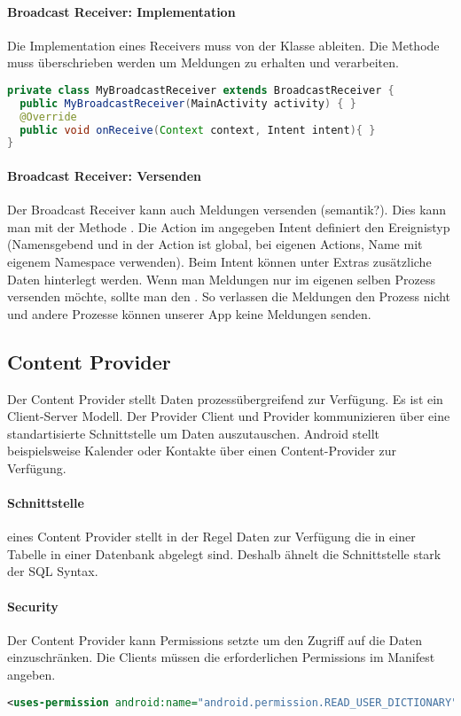 \paragraph{Broadcast Receiver: Implementation} Die Implementation eines Receivers muss von der Klasse  ableiten. Die Methode  muss überschrieben werden um Meldungen zu erhalten und verarbeiten.
\begin{lstlisting}[language=java]
private class MyBroadcastReceiver extends BroadcastReceiver {
  public MyBroadcastReceiver(MainActivity activity) { }
  @Override
  public void onReceive(Context context, Intent intent){ }
}
\end{lstlisting}
\paragraph{Broadcast Receiver: Versenden} Der Broadcast Receiver kann auch Meldungen versenden (semantik?). Dies kann man mit der Methode . Die Action im angegeben Intent definiert den Ereignistyp (Namensgebend und in der Action ist global, bei eigenen Actions, Name mit eigenem Namespace verwenden). Beim Intent können unter Extras zusätzliche Daten hinterlegt werden. Wenn man Meldungen nur im eigenen selben Prozess versenden möchte, sollte man den . So verlassen die Meldungen den Prozess nicht und andere Prozesse können unserer App keine Meldungen senden.
\subsection{Content Provider}
Der Content Provider stellt Daten prozessübergreifend zur Verfügung. Es ist ein Client-Server Modell. Der Provider Client und Provider kommunizieren über eine standartisierte Schnittstelle um Daten auszutauschen. Android stellt beispielsweise Kalender oder Kontakte über einen Content-Provider zur Verfügung.
\paragraph{Schnittstelle} eines Content Provider stellt in der Regel Daten zur Verfügung die in einer Tabelle in einer Datenbank abgelegt sind. Deshalb ähnelt die Schnittstelle stark der SQL Syntax.\\
\paragraph{Security} Der Content Provider kann Permissions setzte um den Zugriff auf die Daten einzuschränken. Die Clients müssen die erforderlichen Permissions im Manifest angeben.
\begin{lstlisting}[language=xml]
<uses-permission android:name="android.permission.READ_USER_DICTIONARY"/>
\end{lstlisting}
